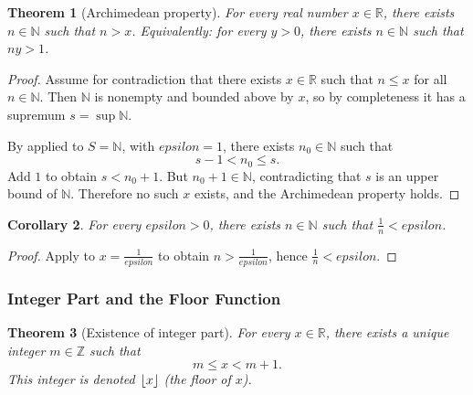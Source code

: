 \documentclass[12pt]{article}
\numberwithin{equation}{section}
\def\eps{epsilon}
\newcommand{\RR}{\mathbb{R}}
\newcommand{\ZZ}{\mathbb{Z}}
\newcommand{\NN}{\mathbb{N}}
\DeclarePairedDelimiter{\floor}{\lfloor}{\rfloor}
\newcommand{\eps}{\varepsilon}               %
\theoremstyle{plain}
\newtheorem{theorem}{Theorem}[section]
\newtheorem{corollary}[theorem]{Corollary}
\theoremstyle{definition}
\theoremstyle{remark}
\begin{document}
\begin{theorem}[Archimedean property]\label{thm:archimedean}
For every real number $x\in\RR$, there exists $n\in\NN$ such that $n>x$.
Equivalently: for every $y>0$, there exists $n\in\NN$ such that $ny>1$.
\end{theorem}

\begin{proof}
Assume for contradiction that there exists $x\in\RR$ such that $n\le x$ for all $n\in\NN$.
Then $\NN$ is nonempty and bounded above by $x$, so by completeness it has a supremum $s=\sup\NN$.

By  applied to $S=\NN$, with $\eps=1$, there exists $n_0\in\NN$ such that
\[
s-1 < n_0 \le s.
\]
Add $1$ to obtain $s < n_0+1$. But $n_0+1\in\NN$, contradicting that $s$ is an upper bound of $\NN$.
Therefore no such $x$ exists, and the Archimedean property holds.
\end{proof}

\begin{corollary}\label{cor:small-1n}
For every $\eps>0$, there exists $n\in\NN$ such that $\frac{1}{n}<\eps$.
\end{corollary}

\begin{proof}
Apply  to $x=\frac{1}{\eps}$ to obtain $n>\frac{1}{\eps}$, hence $\frac{1}{n}<\eps$.
\end{proof}

\subsubsection{Integer Part and the Floor Function}

\begin{theorem}[Existence of integer part]\label{thm:floor-exists}
For every $x\in\RR$, there exists a unique integer $m\in\ZZ$ such that
\[
m \le x < m+1.
\]
This integer is denoted $\floor{x}$ (the floor of $x$).
\end{theorem}
\end{document}
